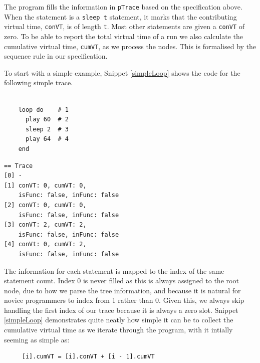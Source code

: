 \documentclass[11pt, abstracton, twoside]{scrartcl}
\begin{document}
The program fills the information in \texttt{pTrace} based on the specification 
above. When the statement is a \texttt{sleep t} statement, it marks that the 
contributing virtual time, \texttt{conVT}, is of length \texttt{t}. Most other
statements are given a \texttt{conVT} of zero. To be able to report the total
virtual time of a run we also calculate the cumulative virtual time, \texttt{cumVT},
as we process the nodes. This is formalised by the sequence rule in our specification.

To start with a simple example, Snippet \ref{simpleLoop} shows the code for the
following simple trace.

\begin{multicols}{2}
	\begin{minipage}{0.4\textwidth}
		\begin{lstlisting}[style = sonicpi]

    loop do    # 1
      play 60  # 2
      sleep 2  # 3
      play 64  # 4
    end

		\end{lstlisting}
		 \label{simpleLoop}
	\end{minipage}

	\begin{minipage}{0.4\textwidth}
	\begin{lstlisting}
== Trace
[0] -                 
[1] conVT: 0, cumVT: 0, 
    isFunc: false, inFunc: false
[2] conVT: 0, cumVT: 0, 
    isFunc: false, inFunc: false
[3] conVT: 2, cumVT: 2, 
    isFunc: false, inFunc: false
[4] conVt: 0, cumVT: 2, 
    isFunc: false, inFunc: false
	\end{lstlisting}
	\end{minipage}

\end{multicols}

The information for each statement is mapped to the index of the same statement 
count. Index 0 is never filled as this is always assigned to the root node, due
to how we parse the tree information, and because it is natural for novice 
programmers to index from 1 rather than 0. Given this, we always skip handling
the first index of our trace because it is always a zero slot. Snippet 
\ref{simpleLoop} demonstrates quite neatly how simple it can be to collect the
cumulative virtual time as we iterate through the program, with it intially
seeming as simple as:
\\
\begin{lstlisting}
     [i].cumVT = [i].conVT + [i - 1].cumVT
\end{lstlisting}
\end{document}
